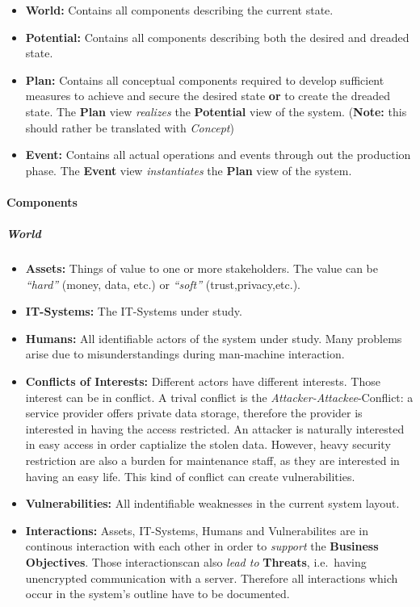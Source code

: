 \begin{itemize}

\item
  \textbf{World:} Contains all components describing the current state.
\item
  \textbf{Potential:} Contains all components describing both the
  desired and dreaded state.
\item
  \textbf{Plan:} Contains all conceptual components required to develop
  sufficient measures to achieve and secure the desired state
  \textbf{or} to create the dreaded state. The \textbf{Plan} view
  \emph{realizes} the \textbf{Potential} view of the system.
  (\textbf{Note:} this should rather be translated with \emph{Concept})
\item
  \textbf{Event:} Contains all actual operations and events through out
  the production phase. The \textbf{Event} view \emph{instantiates} the
  \textbf{Plan} view of the system.
\end{itemize}

\paragraph{Components}

\subparagraph{World}

\begin{itemize}

\item
  \textbf{Assets:} Things of value to one or more stakeholders. The
  value can be \emph{``hard''} (money, data, etc.) or \emph{``soft''}
  (trust,privacy,etc.).
\item
  \textbf{IT-Systems:} The IT-Systems under study.
\item
  \textbf{Humans:} All identifiable actors of the system under study.
  Many problems arise due to misunderstandings during man-machine
  interaction.
\item
  \textbf{Conflicts of Interests:} Different actors have different
  interests. Those interest can be in conflict. A trival conflict is the
  \emph{Attacker-Attackee}-Conflict: a service provider offers private
  data storage, therefore the provider is interested in having the
  access restricted. An attacker is naturally interested in easy access
  in order captialize the stolen data. However, heavy security
  restriction are also a burden for maintenance staff, as they are
  interested in having an easy life. This kind of conflict can create
  vulnerabilities.
\item
  \textbf{Vulnerabilities:} All indentifiable weaknesses in the current
  system layout.
\item
  \textbf{Interactions:} Assets, IT-Systems, Humans and Vulnerabilites
  are in continous interaction with each other in order to
  \emph{support} the \textbf{Business Objectives}. Those interactionscan
  also \emph{lead to} \textbf{Threats}, i.e.~having unencrypted
  communication with a server. Therefore all interactions which occur in
  the system's outline have to be documented.
\end{itemize}


